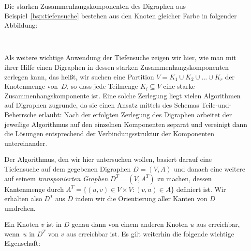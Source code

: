 \begin{bsp}
\label{bsp:starke-zusammenhangskomponenten}
Die starken Zusammenhangskomponenten des Digraphen aus Beispiel~\ref{bsp:tiefensuche} bestehen aus den Knoten gleicher Farbe in folgender Abbildung:

\hfill
{}
\hfill\,
\end{bsp}

\begin{bem}
Als weitere wichtige Anwendung der Tiefensuche zeigen wir hier, wie man mit ihrer Hilfe einen Digraphen in dessen starken Zusammenhangskomponenten zerlegen kann, das heißt, wir suchen eine Partition $V = K_1 \cup K_2 \cup \ldots \cup K_r$ der Knotenmenge von~$D$, so dass jede Teilmenge $K_i \subseteq V$ eine starke Zusammenhangskomponente ist.
Eine solche Zerlegung liegt vielen Algorithmen auf Digraphen zugrunde, da sie einen Ansatz mittels des Schemas Teile-und-Beherrsche erlaubt:
Nach der erfolgten Zerlegung des Digraphen arbeitet der jeweilige Algorithmus auf den einzelnen Komponenten separat und vereinigt dann die Lösungen entsprechend der Verbindungsstruktur der Komponenten untereinander.

Der Algorithmus, den wir hier untersuchen wollen, basiert darauf eine Tiefensuche auf dem gegebenen Digraphen $D=(V,A)$ und danach eine weitere auf seinem \emph{transponierten Graphen} $D^T = (V,A^T)$ zu machen, dessen Kantenmenge durch $A^T = \{(u,v) \in V \times V : (v,u) \in A\}$ definiert ist.
Wir erhalten also $D^T$ aus $D$ indem wir die Orientierung aller Kanten von $D$ umdrehen.

Ein Knoten $v$ ist in $D$ genau dann von einem anderen Knoten $u$ aus erreichbar, wenn~$u$ in $D^T$ von $v$ aus erreichbar ist.
Es gilt weiterhin die folgende wichtige Eigenschaft:
\end{bem} 

